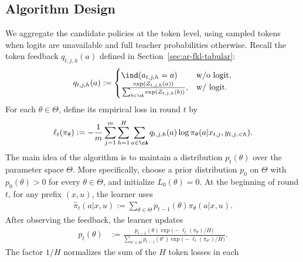\documentclass[11pt]{article}
\begin{document}
\subsection{Algorithm Design}
We aggregate the candidate policies at the token level, using sampled
tokens when logits are unavailable and full teacher probabilities
otherwise. Recall the token feedback $q_{t,j,h}(a)$ defined in Section~\ref{sec:ar-fkl-tabular}: 
\begin{align}
\notag
    q_{t,j,h}(a):=
    \begin{cases}
        \ind(a_{t,j,h}=a)
        & \mathrm{w/o \ logit},\\
        \frac{\exp(Z_{t,j,h}(a))}
             {\sum_{b\in\cA}\exp(Z_{t,j,h}(b))},
        & \mathrm{w/ \ logit}.
    \end{cases}
\end{align}
For each $\theta \in \Theta$, define its empirical loss in round $t$ by
\begin{align}
\label{eq:empirical-loss}
    \ell_t(\pi_\theta)
    :=
    -\frac1m
    \sum_{j=1}^m\sum_{h=1}^H\sum_{a\in\cA}
    q_{t,j,h}(a)
    \log\pi_\theta(a|x_{t,j},y_{t,j,<h}).
\end{align}
The main idea of the algorithm is to maintain a distribution $p_t(\theta)$ over the parameter space $\Theta$. 
More specifically, choose a prior distribution $p_0$ on $\Theta$ with
$p_0(\theta)>0$ for every $\theta\in\Theta$, and initialize
$L_0(\theta)=0$. At the beginning of round $t$, for any prefix $(x,u)$, the learner uses
\begin{align}
    \hat\pi_t(a|x,u)
    :=
    \sum_{\theta\in\Theta}
    p_{t-1}(\theta)\pi_\theta(a|x,u).
    \label{eq:fa-forward-mixture}
\end{align}
After observing the feedback, the learner updates
\begin{align}
    p_t(\theta)
    &:=
    \frac{
        p_{t-1}(\theta)
        \exp\bigl(-\ell_t(\pi_\theta)/H\bigr)
    }{
        \sum_{\theta'\in\Theta}
        p_{t-1}(\theta')
        \exp\bigl(-\ell_t(\pi_{\theta'})/H\bigr)
    }.\label{eq:fa-forward-weight-update}
\end{align}
The factor $1/H$ normalizes the sum of the $H$ token losses in each
\end{document}
